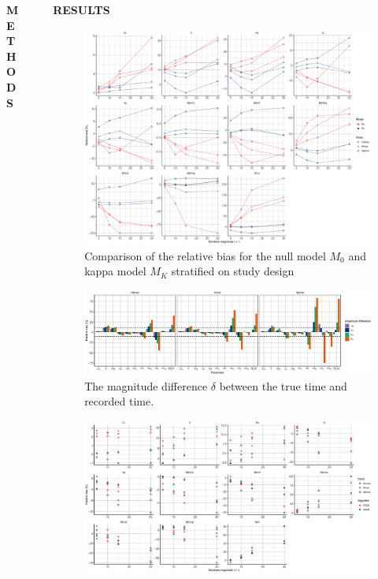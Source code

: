 \documentclass[final]{beamer}
\newlength{\sepwidth}
\newlength{\colwidth}
\newcommand{\separatorcolumn}{\begin{column}{\sepwidth}\end{column}}
\begin{document}
\begin{frame}[t]
\begin{columns}[t]
\begin{column}{\colwidth}
\begin{block}{\textbf{METHODS}}
  \end{block}

\end{column}
\separatorcolumn

\begin{column}{0.6\paperwidth}
\begin{block}{\textbf{RESULTS}}
\begin{figure}
\centering
\includegraphics[width=55cm]{Figure1A}
\caption{Comparison of the relative bias for the null model $M_0$ and kappa model $M_K$ stratified on study design}
\end{figure}
\begin{figure}
\centering
\includegraphics[width=55cm]{Figure3A.eps}
\caption{The magnitude difference $\delta$ between the true time and recorded time. }
\end{figure}
\begin{figure}
\centering
\includegraphics[width=55cm]{Figure4.eps}

\end{figure}
\end{block}
\end{column}
\end{columns}
\end{frame}
\end{document}
